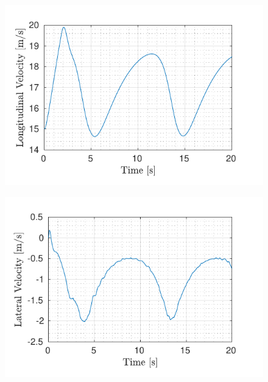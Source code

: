 \begin{figure}[!h]
	\centering
	\begin{minipage}[t]{0.49\textwidth}
		\includegraphics[width=\textwidth]{../../MATLAB/lane_following_circular_path/figure/LongitudinalVelocityVsTime_circular.pdf}
		\label{fig:longitudinal_velocity_laneFollowing_circular}
	\end{minipage}
	\begin{minipage}[t]{0.49\textwidth}
		\includegraphics[width=\textwidth]{../../MATLAB/lane_following_circular_path/figure/LateralVelocityVsTime_circular.pdf}
		\label{fig:lateral_velocity_laneFollowing_circular}
	\end{minipage}
	\begin{minipage}[t]{0.49\textwidth}

\end{minipage}
\end{figure}
